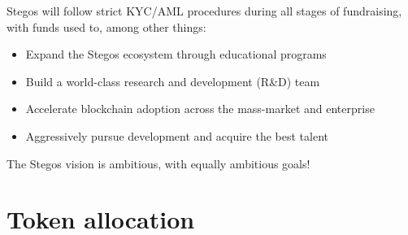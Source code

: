 \documentclass[8pt,fleqn,openany]{book}
\begin{document}
{		Stegos will follow strict KYC/AML procedures during all stages of fundraising, with funds used to, among other things:
		
		\begin{itemize}
			\item Expand the Stegos ecosystem through educational programs
			\item Build a world-class research and development (R\&D) team
			\item Accelerate blockchain adoption across the mass-market and enterprise
			\item Aggressively pursue development and acquire the best talent
		\end{itemize}
		
		The Stegos vision is ambitious, with equally ambitious goals!
		
		\section{Token allocation}
		
		\begin{figure}[h!]
			\centering
			
			

\end{figure}}
\end{document}
